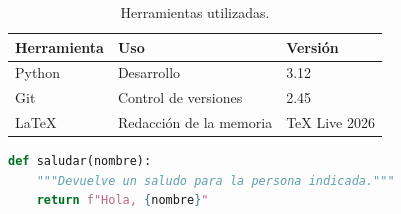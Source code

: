 \begin{table}[htbp]
  \centering
  \caption{Herramientas utilizadas.}
  \label{tab:herramientas}
  \begin{tabular}{lll}
    \toprule
    \textbf{Herramienta} & \textbf{Uso}           & \textbf{Versión} \\
    \midrule
    Python               & Desarrollo             & 3.12 \\
    Git                  & Control de versiones   & 2.45 \\
    \LaTeX{}             & Redacción de la memoria & TeX Live 2026 \\
    \bottomrule
  \end{tabular}
\end{table}

\begin{lstlisting}[language=Python, caption={Ejemplo de función en Python.}, label={lst:hola}]
def saludar(nombre):
    """Devuelve un saludo para la persona indicada."""
    return f"Hola, {nombre}"
\end{lstlisting}
